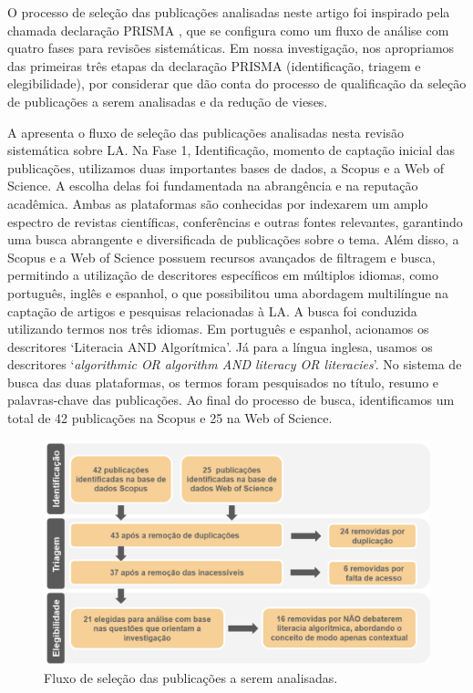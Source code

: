 O processo de seleção das publicações analisadas neste artigo foi
inspirado pela chamada declaração PRISMA \cite{Moher2009},
que se configura como um fluxo de análise com quatro fases para revisões
sistemáticas. Em nossa investigação, nos apropriamos das primeiras três
etapas da declaração PRISMA (identificação, triagem e elegibilidade),
por considerar que dão conta do processo de qualificação da seleção de
publicações a serem analisadas e da redução de vieses.

A  apresenta o fluxo de seleção das publicações analisadas nesta
revisão sistemática sobre LA. Na Fase 1, Identificação, momento de
captação inicial das publicações, utilizamos duas importantes bases de
dados, a Scopus e a Web of Science. A escolha delas foi fundamentada na
abrangência e na reputação acadêmica. Ambas as plataformas são
conhecidas por indexarem um amplo espectro de revistas científicas,
conferências e outras fontes relevantes, garantindo uma busca abrangente
e diversificada de publicações sobre o tema. Além disso, a Scopus e a
Web of Science possuem recursos avançados de filtragem e busca,
permitindo a utilização de descritores específicos em múltiplos idiomas,
como português, inglês e espanhol, o que possibilitou uma abordagem
multilíngue na captação de artigos e pesquisas relacionadas à LA. A
busca foi conduzida utilizando termos nos três idiomas. Em português e
espanhol, acionamos os descritores `Literacia AND Algorítmica'. Já para
a língua inglesa, usamos os descritores `\emph{algorithmic OR algorithm
AND literacy OR literacies}'. No sistema de busca das duas plataformas,
os termos foram pesquisados no título, resumo e palavras-chave das
publicações. Ao final do processo de busca, identificamos um total de 42
publicações na Scopus e 25 na Web of Science.

\begin{figure}[h!]
\centering
\begin{minipage}{0.85\textwidth}
\caption{Fluxo de seleção das publicações a serem analisadas.}
\label{image-01}
\includegraphics[width=\linewidth]{image1.png}
\end{minipage}
\end{figure}


